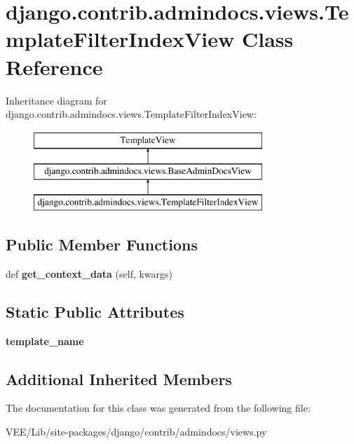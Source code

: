 \hypertarget{classdjango_1_1contrib_1_1admindocs_1_1views_1_1_template_filter_index_view}{}\section{django.\+contrib.\+admindocs.\+views.\+Template\+Filter\+Index\+View Class Reference}
\label{classdjango_1_1contrib_1_1admindocs_1_1views_1_1_template_filter_index_view}
Inheritance diagram for django.\+contrib.\+admindocs.\+views.\+Template\+Filter\+Index\+View\+:\begin{figure}[H]
\begin{center}
\leavevmode
\includegraphics[height=3.000000cm]{classdjango_1_1contrib_1_1admindocs_1_1views_1_1_template_filter_index_view}
\end{center}
\end{figure}
\subsection*{Public Member Functions}
\begin{DoxyCompactItemize}
\item 
\mbox{\label{classdjango_1_1contrib_1_1admindocs_1_1views_1_1_template_filter_index_view_aa8c8d390fcd453905d550f8462bd492b}} 
def {\bfseries get\+\_\+context\+\_\+data} (self, kwargs)
\end{DoxyCompactItemize}
\subsection*{Static Public Attributes}
\begin{DoxyCompactItemize}
\item 
\mbox{\label{classdjango_1_1contrib_1_1admindocs_1_1views_1_1_template_filter_index_view_af9cb09622542258331152999d9ca0a9f}} 
{\bfseries template\+\_\+name}
\end{DoxyCompactItemize}
\subsection*{Additional Inherited Members}


The documentation for this class was generated from the following file\+:\begin{DoxyCompactItemize}
\item 
V\+E\+E/\+Lib/site-\/packages/django/contrib/admindocs/views.\+py\end{DoxyCompactItemize}
